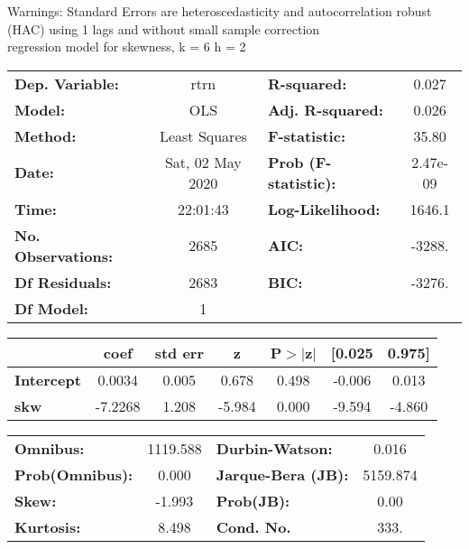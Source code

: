 Warnings: \newline
 [1] Standard Errors are heteroscedasticity and autocorrelation robust (HAC) using 1 lags and without small sample correction\\ 

regression model for skewness, k = 6 h = 2\begin{center}
\begin{tabular}{lclc}
\toprule
\textbf{Dep. Variable:}    &       rtrn       & \textbf{  R-squared:         } &     0.027   \\
\textbf{Model:}            &       OLS        & \textbf{  Adj. R-squared:    } &     0.026   \\
\textbf{Method:}           &  Least Squares   & \textbf{  F-statistic:       } &     35.80   \\
\textbf{Date:}             & Sat, 02 May 2020 & \textbf{  Prob (F-statistic):} &  2.47e-09   \\
\textbf{Time:}             &     22:01:43     & \textbf{  Log-Likelihood:    } &    1646.1   \\
\textbf{No. Observations:} &        2685      & \textbf{  AIC:               } &    -3288.   \\
\textbf{Df Residuals:}     &        2683      & \textbf{  BIC:               } &    -3276.   \\
\textbf{Df Model:}         &           1      & \textbf{                     } &             \\
\bottomrule
\end{tabular}
\begin{tabular}{lcccccc}
                   & \textbf{coef} & \textbf{std err} & \textbf{z} & \textbf{P$> |$z$|$} & \textbf{[0.025} & \textbf{0.975]}  \\
\midrule
\textbf{Intercept} &       0.0034  &        0.005     &     0.678  &         0.498        &       -0.006    &        0.013     \\
\textbf{skw}       &      -7.2268  &        1.208     &    -5.984  &         0.000        &       -9.594    &       -4.860     \\
\bottomrule
\end{tabular}
\begin{tabular}{lclc}
\textbf{Omnibus:}       & 1119.588 & \textbf{  Durbin-Watson:     } &    0.016  \\
\textbf{Prob(Omnibus):} &   0.000  & \textbf{  Jarque-Bera (JB):  } & 5159.874  \\
\textbf{Skew:}          &  -1.993  & \textbf{  Prob(JB):          } &     0.00  \\
\textbf{Kurtosis:}      &   8.498  & \textbf{  Cond. No.          } &     333.  \\
\bottomrule
\end{tabular}
\end{center}

